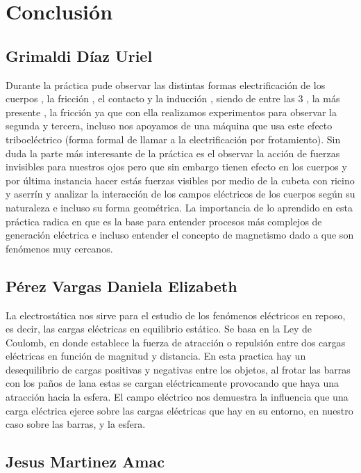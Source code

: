 \documentclass[14pt]{article}
\begin{document}
\clearpage
\newpage





\section{Conclusión}
\subsection{Grimaldi Díaz Uriel}

Durante la práctica pude observar las distintas formas electrificación de los cuerpos , la fricción , el contacto y la inducción , siendo de entre las 3 , la más presente , la fricción ya que con ella realizamos experimentos para observar la segunda y tercera, incluso nos apoyamos de una máquina que usa este efecto triboeléctrico (forma formal de llamar a la electrificación por frotamiento). Sin duda la parte más interesante de la práctica es el observar la acción de fuerzas invisibles para nuestros ojos pero que sin embargo tienen efecto en los cuerpos y por última instancia hacer estás fuerzas visibles por medio de la cubeta con ricino y aserrín y analizar la interacción de los campos eléctricos de los cuerpos según su naturaleza e incluso su forma geométrica. La importancia de lo aprendido en esta práctica radica en que es la base para entender procesos más complejos de generación eléctrica e incluso entender el concepto de magnetismo dado a que son fenómenos muy cercanos.
\subsection{Pérez Vargas Daniela Elizabeth}
La electrostática nos sirve para el estudio de los fenómenos eléctricos en reposo, es decir, las cargas eléctricas en equilibrio estático. Se basa en la Ley de Coulomb, en donde establece la fuerza de atracción o repulsión entre dos cargas eléctricas en función de magnitud y distancia. En esta practica hay un desequilibrio de cargas positivas y negativas entre los objetos, al frotar las barras con los paños de lana estas se cargan eléctricamente provocando que haya una atracción hacia la esfera. El campo eléctrico nos demuestra la influencia que una carga eléctrica ejerce sobre las cargas eléctricas que hay en su entorno, en nuestro caso sobre las barras, y la esfera.
\subsection{Jesus Martinez Amac}
\end{document}
